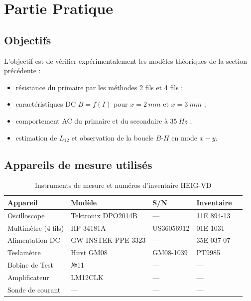 \section{Partie Pratique}
\label{sec:realisation}

\subsection{Objectifs}
L'objectif est de vérifier expérimentalement les modèles théoriques de la section précédente :
\begin{itemize}
\item résistance du primaire par les méthodes 2 fils et 4 fils ;
\item caractéristiques DC \(B=f(I)\) pour \(x=\SI{2}{mm}\) et \(x=\SI{3}{mm}\) ;
\item comportement AC du primaire et du secondaire à \(\SI{35}{Hz}\) ;
\item estimation de \(L_{12}\) et observation de la boucle \(B\)-\(H\) en mode \(x-y\).
\end{itemize}

\subsection{Appareils de mesure utilisés}

\begin{table}[H]
\centering
\caption{Instruments de mesure et numéros d'inventaire HEIG-VD}
\small
\begin{tabular}{@{}p{}p{}p{}p{}p{}@{}}
\toprule
Appareil & Modèle & S/N & Inventaire \\
\midrule
Oscilloscope        & Tektronix DPO2014B & ---          & 11E 894-13 \\
Multimètre (4 fils) & HP 34181A          & US36056912   & 01E-1031   \\
Alimentation DC     & GW INSTEK PPE-3323 & ---          & 35E 037-07 \\
Teslamètre          & Hirst GM08         & GM08-1039    & PT9985     \\
Bobine de Test     & №11               & ---          & --- \\
Amplificateur & LM12CLK & --- & --- \\
Sonde de courant & --- & --- & --- \\
\bottomrule
\end{tabular}
\label{tab:appareils}
\end{table}


